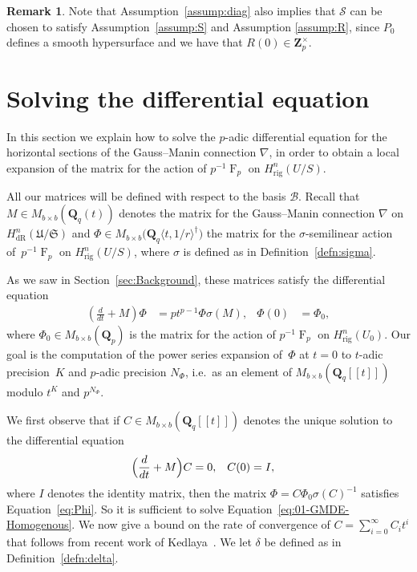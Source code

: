 \documentclass[a4paper,11pt]{article}
\numberwithin{equation}{section}
\newcommand{\ZZ}{\mathbf{Z}} %
\newcommand{\QQ}{\mathbf{Q}} %
\DeclareMathOperator{\Frob}{F}           %
\providecommand{\HdR}{H_{\text{dR}}}    %
\providecommand{\Hrig}{H_{\text{rig}}}  %
\providecommand{\cB}{\mathcal{B}} %
\theoremstyle{definition}
\newtheorem{rem}[thm]{Remark}
\begin{document}
\begin{rem}
Note that Assumption~\ref{assump:diag} 
also implies that $\mathcal{S}$ can be chosen to satisfy Assumption~\ref{assump:S} 
and Assumption \ref{assump:R}, since $P_0$ defines a smooth hypersurface and 
we have that $R(0) \in \ZZ_p^{\times}$. 
\end{rem}


\section{Solving the differential equation}
\label{sec:DifferentialSystem}

In this section we explain how to solve the $p$-adic differential 
equation for the horizontal sections of the Gauss--Manin 
connection $\nabla$, in order to obtain a local expansion of the 
matrix for the action of $p^{-1} \Frob_p$ on $\Hrig^{n}(U/S)$.  

All our matrices will be defined with respect to the basis $\cB$. Recall 
that $M \in M_{b \times b}(\QQ_q(t))$ denotes 
the matrix for the Gauss--Manin connection $\nabla$ on 
$\HdR^n(\mathfrak{U}/\mathfrak{S})$ and 
$\Phi \in M_{b \times b} \bigl(\QQ_q \langle t,1/r \rangle^{\dag} \bigr)$ 
the matrix for the $\sigma$-semilinear action of~$p^{-1} \Frob_p$ 
on $\Hrig^{n}(U/S)$, where $\sigma$ is defined as 
in Definition~\ref{defn:sigma}.

As we saw in Section~\ref{sec:Background}, these matrices satisfy 
the differential equation
\begin{align} \label{eq:Phi}
\left(\frac{d}{dt} + M\right) \Phi &= p t^{p-1} \Phi \sigma(M), &\Phi(0)& = \Phi_0, 
\end{align}
where $\Phi_0 \in M_{b \times b}(\QQ_p)$ is the matrix for the action 
of $p^{-1} \Frob_p$ on $\Hrig^n(U_0)$. Our goal is the computation of 
the power series expansion of~$\Phi$ at $t=0$ to $t$-adic precision~$K$ 
and $p$-adic precision $N_{\Phi}$, i.e.\ as an element of 
$M_{b \times b}(\QQ_q[[t]])$ modulo $t^K$ and $p^{N_{\Phi}}$.

We first observe that if 
$C \in M_{b \times b}(\QQ_q[[t]])$ denotes 
the unique solution to the differential equation
\begin{align} \label{eq:01-GMDE-Homogenous}
\Bigl(\frac{d}{dt} + M\Bigr) C &= 0, &C(0)&=I, 
\end{align}
where $I$ denotes the identity matrix, 
then the matrix $\Phi = C \Phi_0 \sigma(C)^{-1}$ satisfies 
Equation~\eqref{eq:Phi}. So it is sufficient to solve 
Equation~\eqref{eq:01-GMDE-Homogenous}. 
We now give a bound on the rate of 
convergence of $C=\sum_{i=0}^{\infty} C_i t^i$ that
follows from recent work of 
Kedlaya~\citep{Kedlaya2010}. 
We let $\delta$ be defined as in Definition~\ref{defn:delta}. 
\end{document}
